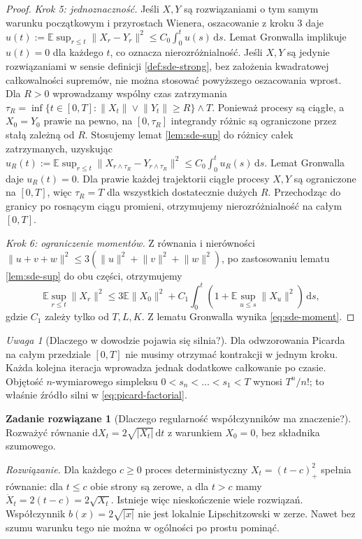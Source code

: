 \documentclass[11pt,a4paper,oneside]{report}
\numberwithin{equation}{chapter}
\theoremstyle{plain}
\theoremstyle{definition}
\newtheorem{zadanie}{Zadanie rozwiązane}[chapter]
\theoremstyle{remark}
\newtheorem{uwaga}{Uwaga}[chapter]
\newcommand{\E}{\mathbb{E}}
\newcommand{\dd}{\mathrm{d}}
\newcommand{\norm}[1]{\lVert #1\rVert}
\begin{document}
\begin{proof}
\emph{Krok 5: jednoznaczność.} Jeśli $X,Y$ są
rozwiązaniami o tym samym warunku początkowym i
przyrostach Wienera, oszacowanie z kroku 3 daje
$u(t):=\E\sup_{r\le t}\norm{X_r-Y_r}^2
\le C_0\int_0^t u(s)\,\dd s$.
Lemat Gronwalla implikuje $u(t)=0$ dla każdego $t$,
co oznacza nierozróżnialność.
Jeśli $X,Y$ są jedynie rozwiązaniami w sensie definicji
\ref{def:sde-strong}, bez założenia kwadratowej całkowalności
supremów, nie można stosować powyższego oszacowania wprost.
Dla $R>0$ wprowadzamy wspólny czas zatrzymania
$\tau_R=\inf\{t\in[0,T]:\norm{X_t}\vee\norm{Y_t}\ge R\}\wedge T$.
Ponieważ procesy są ciągłe, a $X_0=Y_0$ prawie na pewno,
na $[0,\tau_R]$ integrandy różnic są ograniczone przez
stałą zależną od $R$. Stosujemy lemat \ref{lem:sde-sup}
do różnicy całek zatrzymanych, uzyskując
$u_R(t):=\E\sup_{r\le t}\norm{X_{r\wedge\tau_R}-Y_{r\wedge\tau_R}}^2
\le C_0\int_0^t u_R(s)\,\dd s$.
Lemat Gronwalla daje $u_R(t)=0$. Dla prawie każdej trajektorii
ciągłe procesy $X,Y$ są ograniczone na $[0,T]$, więc
$\tau_R=T$ dla wszystkich dostatecznie dużych $R$.
Przechodząc do granicy po rosnącym ciągu promieni,
otrzymujemy nierozróżnialność na całym $[0,T]$.

\emph{Krok 6: ograniczenie momentów.}
Z równania i nierówności
$\norm{u+v+w}^2\le3(\norm u^2+\norm v^2+\norm w^2)$,
po zastosowaniu lematu \ref{lem:sde-sup} do obu części,
otrzymujemy
\[
\E\sup_{r\le t}\norm{X_r}^2
\le3\E\norm{X_0}^2+C_1\int_0^t(1+
\E\sup_{u\le s}\norm{X_u}^2)\,\dd s,
\]
gdzie $C_1$ zależy tylko od $T,L,K$.
Z lematu Gronwalla wynika \eqref{eq:sde-moment}.
\end{proof}

\begin{uwaga}[Dlaczego w dowodzie pojawia się silnia?]
Dla odwzorowania Picarda na całym przedziale $[0,T]$
nie musimy otrzymać kontrakcji w jednym kroku.
Każda kolejna iteracja wprowadza jednak dodatkowe
całkowanie po czasie. Objętość $n$-wymiarowego
simpleksu $0<s_n<\dots<s_1<T$ wynosi $T^n/n!$;
to właśnie źródło silni w \eqref{eq:picard-factorial}.
\end{uwaga}

\begin{zadanie}[Dlaczego regularność współczynników ma znaczenie?]
Rozważyć równanie $\dd X_t=2\sqrt{|X_t|}\,\dd t$
z warunkiem $X_0=0$, bez składnika szumowego.

\emph{Rozwiązanie.} Dla każdego $c\ge0$ proces
deterministyczny $X_t=(t-c)_+^2$ spełnia równanie:
dla $t\le c$ obie strony są zerowe, a dla $t>c$
mamy $\dot X_t=2(t-c)=2\sqrt{X_t}$. Istnieje
więc nieskończenie wiele rozwiązań. Współczynnik
$b(x)=2\sqrt{|x|}$ nie jest lokalnie Lipschitzowski
w zerze. Nawet bez szumu warunku tego nie można
w ogólności po prostu pominąć.
\end{zadanie}
\end{document}
